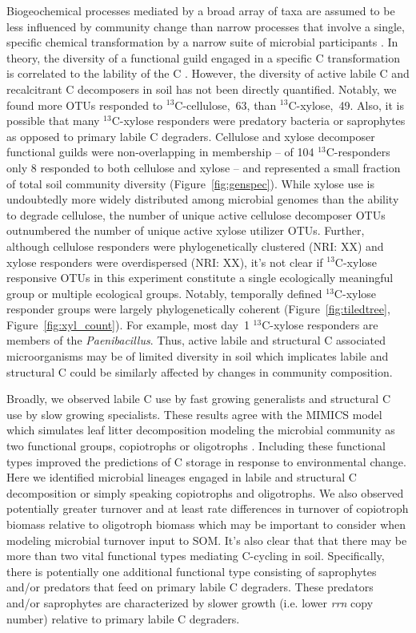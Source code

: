 Biogeochemical processes mediated by a broad array of taxa are assumed to
be less influenced by community change than narrow processes that involve
a single, specific chemical transformation by a narrow suite of microbial
participants \citep{Schimel_1995,McGuire2010}. In theory, the diversity of
a functional guild engaged in a specific C transformation is correlated to the
lability of the C \citep{McGuire2010}. However, the diversity of active
labile C and recalcitrant C decomposers in soil has not been directly
quantified. Notably, we found more OTUs responded to $^{13}$C-cellulose,~63,
than $^{13}$C-xylose,~49. Also, it is possible that many $^{13}$C-xylose
responders were predatory bacteria or saprophytes as opposed to primary labile
C degraders. Cellulose and xylose decomposer functional guilds were
non-overlapping in membership -- of 104 $^{13}$C-responders only 8 responded to
both cellulose and xylose -- and represented a small fraction of total soil
community diversity (Figure~\ref{fig:genspec}). While xylose use is undoubtedly
more widely distributed among microbial genomes than the ability to degrade
cellulose, the number of unique active cellulose decomposer OTUs outnumbered
the number of unique active xylose utilizer OTUs. Further, although cellulose
responders were phylogenetically clustered (NRI: XX) and xylose responders were
overdispersed (NRI: XX), it's not clear if $^{13}$C-xylose responsive OTUs in
this experiment constitute a single ecologically meaningful group or multiple
ecological groups. Notably, temporally defined $^{13}$C-xylose responder groups
were largely phylogenetically coherent (Figure~\ref{fig:tiledtree},
Figure~\ref{fig:xyl_count}). For example, most day~1 $^{13}$C-xylose responders
are members of the \textit{Paenibacillus}. Thus, active labile and structural
C associated microorganisms may be of limited diversity in soil which
implicates labile and structural C could be similarly affected by changes in
community composition. 

Broadly, we observed labile C use by fast growing generalists and structural
C use by slow growing specialists. These results agree with the MIMICS model
which simulates leaf litter decomposition modeling the microbial community as
two functional groups, copiotrophs or oligotrophs \citep{wieder_2014a}.
Including these functional types improved the predictions of C storage in
response to environmental change. Here we identified microbial
lineages engaged in labile and structural C decomposition or simply speaking
copiotrophs and oligotrophs. We also observed potentially greater turnover and
at least rate differences in turnover of copiotroph biomass relative to
oligotroph biomass which may be important to consider when modeling microbial
turnover input to SOM. It's also clear that that there may be more than two
vital functional types mediating C-cycling in soil. Specifically, there is
potentially one additional functional type consisting of saprophytes and/or
predators that feed on primary labile C degraders. These predators and/or
saprophytes are characterized by slower growth (i.e. lower \textit{rrn} copy
number) relative to primary labile C degraders. 

